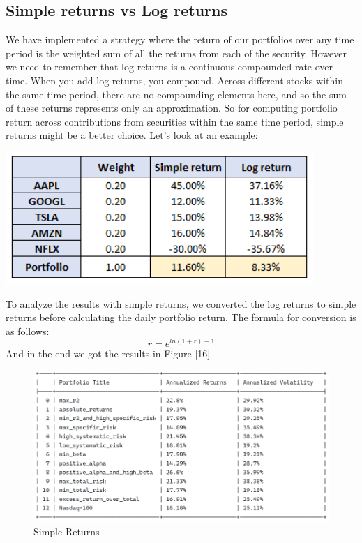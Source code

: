 \documentclass[twocolumn]{article}
\begin{document}
\subsection{Simple returns vs Log returns}
We have implemented a strategy where the return of our portfolios over any time period is the weighted sum of all the returns from each of the security. However we need to remember that log returns is a continuous compounded rate over time. When you add log returns, you compound. Across different stocks within the same time period, there are no compounding elements here, and so the sum of these returns represents only an approximation. So for computing portfolio return across contributions from securities within the same time period, simple returns might be a better choice. Let's look at an example:
\begin{center}
\includegraphics[scale=0.5]{logvsimple.png}
\end{center}
To analyze the results with simple returns, we converted the log returns to simple returns before calculating the daily portfolio return. The formula for conversion is as follows:
\begin{equation}
r = e^{ln(1+r) - 1}
\end{equation}
And in the end we got the results in Figure [16]
\begin{figure}[t]
\centering\includegraphics[scale=0.7]{simplereturns.png}
\caption{Simple Returns}
\end{figure}
\end{document}
